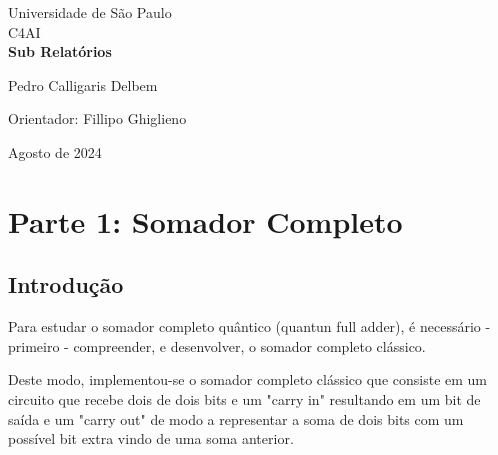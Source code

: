 \documentclass[12pt, a4paper]{article} %
\begin{document}
	
	\begin{titlepage}
		\begin{center}
\Huge{Universidade de São Paulo}\\
\large{C4AI}\\
\vspace{20pt}
\vspace{200pt}
\textbf{Sub Relat\'orios}\\
\vspace{8cm}
		\end{center}

\begin{flushleft}
\begin{tabbing}
Pedro Calligaris Delbem\\
\end{tabbing}
\vspace{0.5cm}
Orientador: Fillipo Ghiglieno\\		
		\end{flushleft}
	
		\begin{center}
			\vspace{\fill}
	Agosto de 2024
		\end{center}
	\end{titlepage}

	\tableofcontents 
	\thispagestyle{empty}
	\newpage

\section{Parte 1: Somador Completo}

    \subsection{Introdução}
    
        Para estudar o somador completo qu\^antico (quantun full adder), \'e necess\'ario - primeiro - compreender, e desenvolver, o somador completo cl\'assico.
        
        Deste modo, implementou-se o somador completo cl\'assico que consiste em um circuito que recebe dois de dois bits e um "carry in" resultando em um bit de sa\'ida e um "carry out" de modo a representar a soma de dois bits com um poss\'ivel bit extra vindo de uma soma anterior.
    
\end{document}
